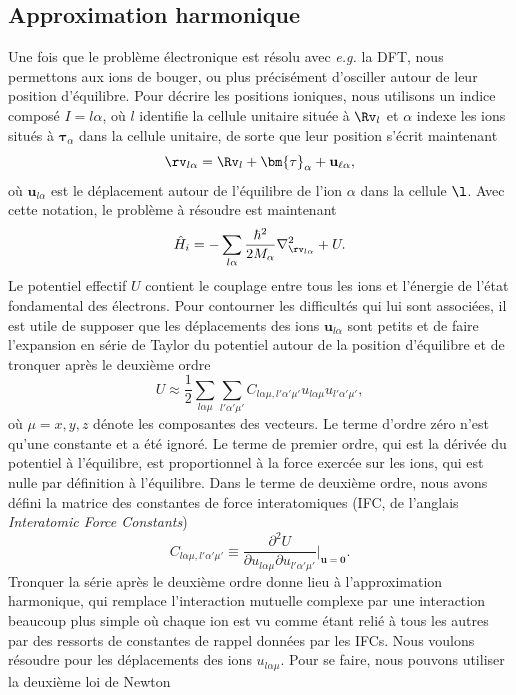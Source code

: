 \subsection{Approximation harmonique}
Une fois que le problème électronique est résolu avec \textit{e.g.} la DFT, nous permettons aux ions de bouger, ou plus précisément d'osciller autour de leur position d'équilibre. Pour décrire les positions ioniques, nous utilisons un indice composé $I=l\alpha$, où $l$ identifie la cellule unitaire située à $\Rv_l$ et $\alpha$ indexe les ions situés à $\bm{\tau}_\alpha$ dans la cellule unitaire, de sorte que leur position s'écrit maintenant
\begin{equation}
    \rv_{l\alpha}=\Rv_l+\bm{\tau}_\alpha+\mathbf{u}_{\ell\alpha},
    \label{eqn:c2_rla}
\end{equation}
où $\mathbf{u}_{l\alpha}$ est le déplacement autour de l'équilibre de l'ion $\alpha$ dans la cellule $\l$. Avec cette notation, le problème à résoudre est maintenant
\begin{equation}
    \hat{H}_i=-\sum_{l\alpha}\frac{\hbar^2}{2M_\alpha}\nabla^2_{\rv_{l\alpha}}+U.
    \label{eqn:c2_Hila}
\end{equation}
Le potentiel effectif $U$ contient le couplage entre tous les ions et l'énergie de l'état fondamental des électrons. Pour contourner les difficultés qui lui sont associées, il est utile de supposer que les déplacements des ions $\mathbf{u}_{l\alpha}$ sont petits et de faire l'expansion en série de Taylor du potentiel autour de la position d'équilibre et de tronquer après le deuxième ordre
\begin{equation}
    U\approx \frac{1}{2}\sum_{l\alpha\mu}\sum_{l'\alpha'\mu'}C_{l\alpha\mu,l'\alpha'\mu'}u_{l\alpha\mu}u_{l'\alpha'\mu'},
\end{equation}
où $\mu=x,y,z$ dénote les composantes des vecteurs. Le terme d'ordre zéro n'est qu'une constante et a été ignoré. Le terme de premier ordre, qui est la dérivée du potentiel à l'équilibre, est proportionnel à la force exercée sur les ions, qui est nulle par définition à l'équilibre. Dans le terme de deuxième ordre, nous avons défini la matrice des constantes de force interatomiques (IFC, de l'anglais \textit{Interatomic Force Constants})
\begin{equation}
    C_{l\alpha\mu,l'\alpha'\mu'}\equiv \frac{\partial^2U}{\partial u_{l\alpha\mu}\partial u_{l'\alpha'\mu'}}\bigg\rvert_{\mathbf{u}=\mathbf{0}}.
    \label{eqn:c2_IFC}
\end{equation}
Tronquer la série après le deuxième ordre donne lieu à l'approximation harmonique, qui remplace l'interaction mutuelle complexe par une interaction beaucoup plus simple où chaque ion est vu comme étant relié à tous les autres par des ressorts de constantes de rappel données par les IFCs. Nous voulons résoudre pour les déplacements des ions $u_{l\alpha\mu}$. Pour se faire, nous pouvons utiliser la deuxième loi de Newton
